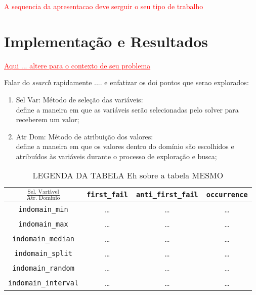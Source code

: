 \documentclass[12pt]{article}
\theoremstyle{definition}
\begin{document}
{\huge \textcolor{red}{
A sequencia da apresentacao deve serguir
o seu tipo de trabalho
}}



\section{Implementação e Resultados}
\label{sec_implementacao}


{\Large \textcolor{red}{\underline {Aqui ... altere para o 
contexto de seu problema}}}

Falar do \textit{search} rapidamente ....
e enfatizar os doi pontos que serao explorados:

\begin{enumerate}

\item  Sel Var: Método de seleção das variáveis:\\
define a maneira em que as
variáveis serão selecionadas pelo solver para receberem um valor;



\item Atr Dom: Método de atribuição dos valores:\\
define a maneira em que
os valores dentro do domínio são escolhidos e atribuídos às variáveis durante o processo de exploração e busca;
\end{enumerate}


\begin{table}[!ht]

\caption{LEGENDA DA TABELA Eh sobre a tabela MESMO}
\label{tab01}
{\small
\begin{center}
\begin{tabular}{c||c|c|c} \hline\hline
$\frac{\textrm{Sel. Variável}}{\textrm{Atr. Dominio}}$  
& \texttt{first\_fail}
& \texttt{anti\_first\_fail}  & \texttt{occurrence} 
 \\ \hline\hline
\texttt{indomain\_min} & \ldots & \ldots & \ldots \\ \hline
\texttt{indomain\_max}  &  \ldots & \ldots  & \ldots \\ \hline
\texttt{indomain\_median}   & \ldots &  \ldots & \ldots \\ \hline
 \texttt{indomain\_split} &  \ldots & \ldots & \ldots \\ \hline
\texttt{indomain\_random} & \ldots & \ldots & \ldots \\ \hline
\texttt{indomain\_interval}   & \ldots & \ldots  & \ldots \\ \hline\hline

\end{tabular}
\end{center}
}

\end{table}
\end{document}

